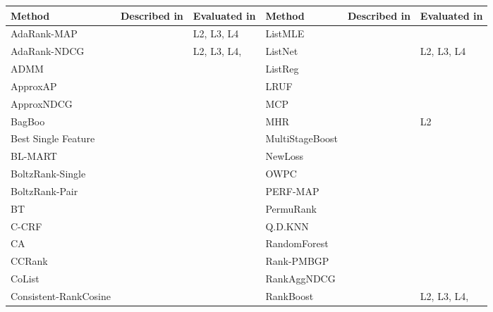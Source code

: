 \documentclass{sig-alternate}
\begin{document}
\label{app:ltr_methods_used}
\label{app:raw_data}
\begin{table}[!hpt]
\scriptsize{
\begin{tabular}{lll|lll}\toprule
Method & Described in & Evaluated in & Method & Described in & Evaluated in\\
\midrule
AdaRank-MAP & \cite{Xu2007} & L2, L3, L4 & ListMLE & \cite{Xia2008} & \cite{Lin2010, Lin2011, Gao2014} \\
AdaRank-NDCG & \cite{Xu2007} & L2, L3, L4,  \cite{Busa-Fekete2013,Tan2013} & ListNet & \cite{Cao2007} & L2, L3, L4 \\ 
ADMM & \cite{Duh2011} & \cite{Duh2011} & ListReg & \cite{Wu2011} & \cite{Wu2011} \\ 
ApproxAP & \cite{Qin2010b} & \cite{Qin2010b} & LRUF & \cite{Torkestani2012b} & \cite{Torkestani2012b} \\ 
ApproxNDCG & \cite{Qin2010b} & \cite{Qin2010b} & MCP & \cite{Laporte2013} & \cite{Laporte2013} \\ 
BagBoo & \cite{Pavlov2010} & \cite{Ganjisaffar2011c} & MHR & \cite{Qin2007} & L2 \\ 
Best Single Feature &  & \cite{Gomes2013} &  MultiStageBoost & \cite{Kao2013} & \cite{Kao2013} \\ 
BL-MART & \cite{Ganjisaffar2011c} & \cite{Ganjisaffar2011c} &  NewLoss & \cite{Peng2010} & \cite{Peng2010} \\ 
BoltzRank-Single & \cite{Volkovs2009} & \cite{Volkovs2009, Volkovs2013} & OWPC & \cite{Usunier2009} & \cite{Usunier2009} \\ 
BoltzRank-Pair & \cite{Volkovs2009} & \cite{Volkovs2009, Ganjisaffar2011c, Volkovs2013} & PERF-MAP & \cite{Pan2011} & \cite{Torkestani2012b} \\ 
BT & \cite{Zhou2008} & \cite{Zhou2008} & PermuRank & \cite{Xu2008} & \cite{Xu2008} \\ 
C-CRF & \cite{Qin2008b} & \cite{Qin2008b} & Q.D.KNN & \cite{Geng2008} & \cite{Wang2013} \\ 
CA & \cite{Metzler2007} & \cite{Busa-Fekete2013,Tan2013} & RandomForest &  & \cite{Gomes2013} \\ 
CCRank & \cite{Wang2011c} & \cite{Wang2011c} & Rank-PMBGP & \cite{Sato2013} & \cite{Sato2013} \\ 
CoList & \cite{Gao2014} & \cite{Gao2014} & RankAggNDCG & \cite{Wang2013} & \cite{Wang2013} \\
Consistent-RankCosine & \cite{Ravikumar2011} & \cite{Tan2013} & RankBoost & \cite{Freund2003} & L2, L3, L4, \cite{Busa-Fekete2013, Alcantara2010} \\

\end{tabular}}
\end{table}
\end{document}
